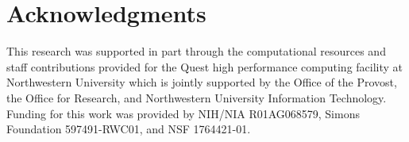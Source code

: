 
\section{Acknowledgments}
This research was supported in part through the computational resources and staff contributions provided for the Quest high performance computing facility at Northwestern University which is jointly supported by the Office of the Provost, the Office for Research, and Northwestern University Information Technology. 
%
Funding for this work was provided by NIH/NIA R01AG068579, Simons Foundation 597491-RWC01, and NSF 1764421-01.





\address{Connor Puritz\\
  Department of Engineering Sciences and Applied Mathematics, Northwestern University\\
  Evanston, IL 60208\\
  ORCiD: 0000-0001-7602-0444\\
  Email: }

\address{Elan Ness-Cohn\\
  Department of Molecular Biosciences, Northwestern University\\
  Evanston, IL 60208\\
  ORCiD: 0000-0002-3935-6667\\
  Email: \\
  Website: \url{https://sites.northwestern.edu/elannesscohn/}}

\address{Rosemary Braun\\
  Department of Molecular Biosciences, Northwestern University\\
  Evanston, IL 60208\\
  ORCiD: 0000-0001-9668-9866\\
  Email: \\
  Website: \url{https://sites.northwestern.edu/braunlab/}}
  